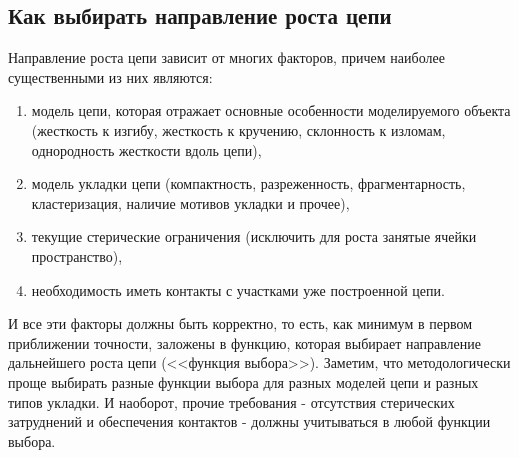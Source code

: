 \documentclass[tikz,a4paper]{scrartcl} %
\begin{document}
\subsection*{Как выбирать направление роста цепи}
Направление роста цепи зависит от многих факторов, причем наиболее существенными из них являются:
\begin{enumerate}
\item модель цепи, которая отражает основные особенности моделируемого объекта (жесткость к изгибу, жесткость к кручению, склонность к изломам, однородность жесткости вдоль цепи), 
\item модель укладки цепи (компактность, разреженность, фрагментарность,  кластеризация, наличие мотивов укладки и прочее), 
\item текущие стерические ограничения (исключить для роста занятые ячейки пространство), 
\item необходимость иметь контакты с участками уже построенной цепи.
\end{enumerate}
И все эти факторы должны быть корректно, то есть, как минимум в первом приближении точности, заложены в функцию, которая выбирает направление дальнейшего роста цепи (<<функция выбора>>). Заметим, что методологически проще выбирать разные функции выбора для разных моделей цепи и разных типов укладки. И наоборот, прочие требования - отсутствия стерических затруднений и обеспечения контактов - должны учитываться в любой функции выбора. 
\end{document}

